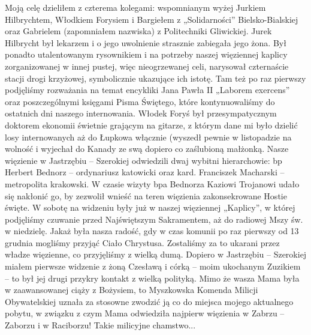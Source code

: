 Moją celę dzieliłem z czterema kolegami: wspomnianym wyżej Jurkiem Hilbrychtem, Włodkiem Forysiem i Bargiełem z „Solidarności” Bielsko-Bialskiej oraz Gabrielem (zapomniałem nazwiska) z Politechniki Gliwickiej. Jurek Hilbrycht był lekarzem i o jego uwolnienie strasznie zabiegała jego żona. Był ponadto utalentowanym rysownikiem i na potrzeby naszej więziennej kaplicy zorganizowanej w innej pustej, więc nieogrzewanej celi, narysował czternaście stacji drogi krzyżowej, symbolicznie ukazujące ich istotę. Tam też po raz pierwszy podjęliśmy rozważania na temat encykliki Jana Pawła II „Laborem exercens” oraz poszczególnymi księgami Pisma Świętego, które kontynuowaliśmy do ostatnich dni naszego internowania. Włodek Foryś był przesympatycznym doktorem ekonomii świetnie grającym na gitarze, z którym dane mi było dzielić losy  internowanych aż do Łupkowa włącznie (wyszedł pewnie w listopadzie na wolność i wyjechał do Kanady ze swą dopiero co zaślubioną małżonką. Nasze więzienie w Jastrzębiu – Szerokiej odwiedzili dwaj wybitni hierarchowie: bp Herbert Bednorz – ordynariusz katowicki oraz kard. Franciszek Macharski – metropolita krakowski. W czasie wizyty bpa Bednorza Kaziowi Trojanowi udało się nakłonić go, by zezwolił wnieść na teren więzienia zakonsekrowane Hostie święte. W sobotę na widzeniu były już w naszej więziennej „Kaplicy”, w której podjęliśmy czuwanie przed Najświętszym Sakramentem, aż do radiowej Mszy św. w  niedzielę. Jakaż była nasza radość, gdy w czas komunii po raz pierwszy od 13 grudnia mogliśmy przyjąć Ciało Chrystusa. Zostaliśmy za to ukarani przez władze więzienne, co przyjęliśmy z wielką dumą. Dopiero w Jastrzębiu – Szerokiej miałem pierwsze widzenie z żoną Czesławą i córką – moim ukochanym Zuzikiem – to był jej drugi przykry kontakt z wielką polityką. Mimo że wasza Mama była w zaawansowanej ciąży z Bożysiem, to Myszkowska Komenda Milicji Obywatelskiej uznała za stosowne zwodzić ją co do miejsca mojego aktualnego pobytu, w związku z czym Mama odwiedziła najpierw więzienia w Zabrzu – Zaborzu i w Raciborzu! Takie milicyjne chamstwo...

